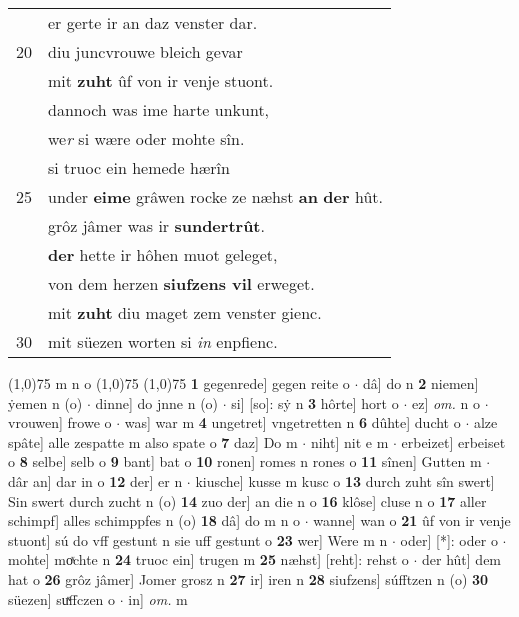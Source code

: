 \documentclass[8pt,a4paper,notitlepage]{article}
\begin{document}
\begin{table}[ht]
\begin{minipage}[t]{0.5\linewidth}
\begin{tabular}{rl}
 & er gerte ir an daz venster dar.\\ 
20 & diu juncvrouwe bleich gevar\\ 
 & mit \textbf{zuht} ûf von ir venje stuont.\\ 
 & dannoch was ime harte unkunt,\\ 
 & we\textit{r} si wære oder mohte sîn.\\ 
 & si truoc ein hemede hærîn\\ 
25 & under \textbf{eime} grâwen rocke ze næhst \textbf{an} \textbf{der} hût.\\ 
 & grôz jâmer was ir \textbf{sundertrût}.\\ 
 & \textbf{der} hette ir hôhen muot geleget,\\ 
 & von dem herzen \textbf{siufzens vil} erweget.\\ 
 & mit \textbf{zuht} diu maget zem venster gienc.\\ 
30 & mit süezen worten si \textit{in} enpfienc.\\ 
\end{tabular}
\scriptsize
\line(1,0){75} \newline
m n o \newline
\line(1,0){75} \newline
\newline
\line(1,0){75} \newline
\textbf{1} gegenrede] gegen reite o  $\cdot$ dâ] do n \textbf{2} niemen] ẏemen n (o)  $\cdot$ dinne] do jnne n (o)  $\cdot$ si] [so]: sẏ n \textbf{3} hôrte] hort o  $\cdot$ ez] \textit{om.} n o  $\cdot$ vrouwen] frowe o  $\cdot$ was] war m \textbf{4} ungetret] vngetretten n \textbf{6} dûhte] ducht o  $\cdot$ alze spâte] alle zespatte m also spate o \textbf{7} daz] Do m  $\cdot$ niht] nit e m  $\cdot$ erbeizet] erbeiset o \textbf{8} selbe] selb o \textbf{9} bant] bat o \textbf{10} ronen] romes n rones o \textbf{11} sînen] Gutten m  $\cdot$ dâr an] dar in o \textbf{12} der] er n  $\cdot$ kiusche] kusse m kusc o \textbf{13} durch zuht sîn swert] Sin swert durch zucht n (o) \textbf{14} zuo der] an die n o \textbf{16} klôse] cluse n o \textbf{17} aller schimpf] alles schimppfes n (o) \textbf{18} dâ] do m n o  $\cdot$ wanne] wan o \textbf{21} ûf von ir venje stuont] sú do vff gestunt n sie uff gestunt o \textbf{23} wer] Were m n  $\cdot$ oder] [*]: oder o  $\cdot$ mohte] moͯchte n \textbf{24} truoc ein] trugen m \textbf{25} næhst] [reht]: rehst o  $\cdot$ der hût] dem hat o \textbf{26} grôz jâmer] Jomer grosz n \textbf{27} ir] iren n \textbf{28} siufzens] súfftzen n (o) \textbf{30} süezen] suͯffczen o  $\cdot$ in] \textit{om.} m \newline
\end{minipage}
\end{table}
\end{document}
